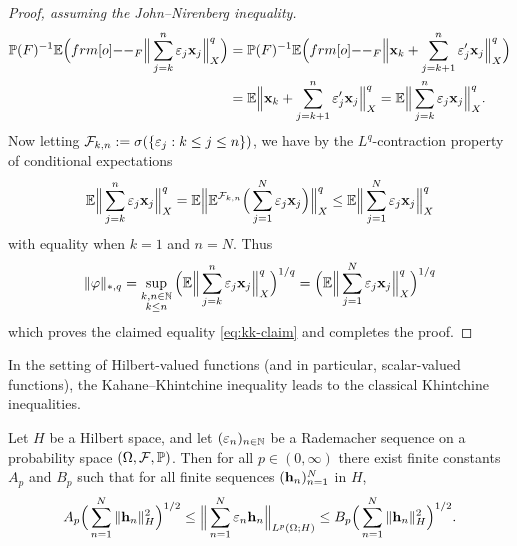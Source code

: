 \begin{proof}[Proof, assuming the John--Nirenberg inequality]
\begin{equation*}
\begin{aligned}
      \P(F)^{-1} \E \Big( \1_{F} \Big\| \sum_{j=k}^{n} \varepsilon_j \mb{x}_j\Big\|_{X}^q \Big)
      &=  \P(F)^{-1} \E \Big( \1_{F} \Big\|\mb{x}_k + \sum_{j=k+1}^{n} \varepsilon_{j}^{\prime} \mb{x}_j \Big\|_{X}^{q} \Big) \\
      &=  \E \Big\|\mb{x}_k + \sum_{j=k+1}^{n} \varepsilon_{j}^{\prime} \mb{x}_j \Big\|_{X}^{q} 
      =  \E  \Big\|\sum_{j=k}^{n} \varepsilon_{j} \mb{x}_j \Big\|_{X}^{q}. \\
    \end{aligned}
  \end{equation*}
  Now letting $\mathcal{F}_{k,n} := \sigma(\{\varepsilon_j : k \leq j \leq n\})$, we have by the $L^q$-contraction property of conditional expectations
  \begin{equation*}
    \mathbb{E} \Big\|\sum_{j=k}^{n} \varepsilon_{j} \mathbf{x}_j \Big\|_{X}^{q}
    = \mathbb{E} \Big\|\mathbb{E}^{\mathcal{F}_{k,n}} \Big(\sum_{j=1}^{N} \varepsilon_{j} \mathbf{x}_j \Big)\Big\|_{X}^{q}
    \leq \mathbb{E} \Big\|\sum_{j=1}^{N} \varepsilon_{j} \mathbf{x}_j \Big\|_{X}^{q}
  \end{equation*}
  with equality when $k=1$ and $n=N$.
  Thus
  \begin{equation*}
    \|\varphi\|_{*,q} =  \sup_{\substack{k,n \in \mathbb{N} \\ k \leq n}}  \Big(\mathbb{E}  \Big\|\sum_{j=k}^{n} \varepsilon_{j} \mathbf{x}_j \Big\|_{X}^{q}\Big)^{1/q} = \Big(\mathbb{E}  \Big\|\sum_{j=1}^{N} \varepsilon_{j} \mathbf{x}_j \Big\|_{X}^{q}\Big)^{1/q}
  \end{equation*}
  which proves the claimed equality \eqref{eq:kk-claim} and completes the proof. 
\end{proof}

In the setting of Hilbert-valued functions (and in particular, scalar-valued functions), the Kahane--Khintchine inequality leads to the classical Khintchine inequalities.

\begin{cor}
  Let $H$ be a Hilbert space, and let $(\varepsilon_{n})_{n \in \mathbb{N}}$ be a Rademacher sequence on a probability space $(\Omega, \mathcal{F}, \mathbb{P})$.
  Then for all $p \in (0,\infty)$ there exist finite constants $A_p$ and $B_p$ such that for all finite sequences $(\mathbf{h}_n)_{n=1}^N$ in $H$,
  \begin{equation*}
    A_p \Big( \sum_{n=1}^N \|\mathbf{h}_n\|_H^2 \Big)^{1/2} \leq \Big\| \sum_{n=1}^N \varepsilon_n \mathbf{h}_n \Big\|_{L^p(\Omega;H)} \leq B_p \Big( \sum_{n=1}^N \|\mathbf{h}_n\|_H^2 \Big)^{1/2}.
  \end{equation*}
\end{cor}

